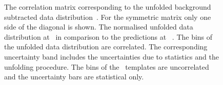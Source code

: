 %
%
%
\begin{figure}[tbp!]
\centering
{}
\hfill
{}
\caption[Correlation matrix of the unfolded \mlb\ data distribution and \truelevel\ templates]{
%
The correlation matrix corresponding to the unfolded background subtracted data distribution~.
%
For the symmetric matrix only one side of the diagonal is shown.
%
The normalised unfolded data distribution at \truelevel\ in comparison to the predictions at \truelevel~.
%
The bins of the unfolded data distribution are correlated.
%
The corresponding uncertainty band includes the uncertainties due to statistics and the unfolding procedure.
%
The bins of the \truelevel\ templates are uncorrelated and the uncertainty bars are statistical only.
%
\label{fig:unfoldclosure}
}
\end{figure}


